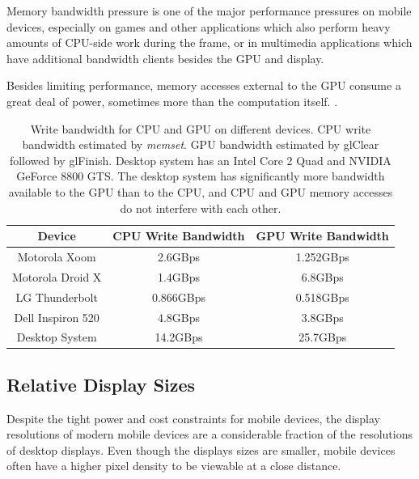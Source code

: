 
Memory bandwidth pressure is one of the major performance pressures on mobile
devices, especially on games and other applications which also perform heavy
amounts of CPU-side work during the frame, or in multimedia applications which
have additional bandwidth clients besides the GPU and display.

Besides limiting performance, memory accesses external to the GPU consume a
great deal of power, sometimes more than the computation itself.
\cite{Antochi04}.

\begin{table}[htb]\centering \begin{tabular}{|c||c|c|} 
\hline \small{Device} & \small{CPU Write Bandwidth} & \small{GPU Write Bandwidth}   \\ \hline 
\hline \small{Motorola Xoom} & \small{2.6GBps} & \small{1.252GBps} \\ 
\hline \small{Motorola Droid X} & \small{1.4GBps} & \small{6.8GBps} \\ 
\hline \small{LG Thunderbolt} & \small{0.866GBps} & \small{0.518GBps} \\ 
\hline \small{Dell Inspiron 520} & \small{4.8GBps} & \small{3.8GBps} \\ 
\hline \small{Desktop System} & \small{14.2GBps} & \small{25.7GBps}\\
\hline
\end{tabular} 
\caption{Write bandwidth for CPU and GPU on different devices.  CPU write
bandwidth estimated by \textit{memset}.  GPU bandwidth estimated by glClear
followed by glFinish.  Desktop system has an Intel Core 2 Quad and NVIDIA
GeForce 8800 GTS.  The desktop system has significantly more bandwidth
available to the GPU than to the CPU, and CPU and GPU memory accesses do not
interfere with each other.}
\label{JonMcCaffrey:bandwidth} \end{table}

\subsection{Relative Display Sizes}\label{Jon-McCaffrey:relative-display-sizes}

 

Despite the tight power and cost constraints for mobile devices, the display
resolutions of modern mobile devices are a considerable fraction of the
resolutions of desktop displays.  Even though the displays sizes are smaller,
mobile devices often have a higher pixel density to be viewable at a close
distance.

